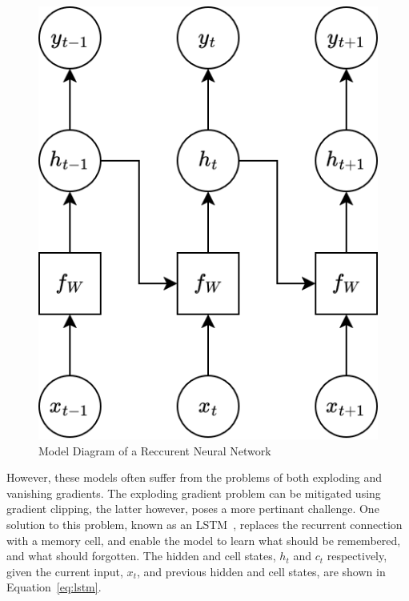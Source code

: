 \documentclass[twocolumn]{article}
\begin{document}
\begin{figure}[h]
    \centering
    \includegraphics[scale=0.25]{assets/rnn.png}
    \caption{Model Diagram of a Reccurent Neural Network}
    \label{fig:rnn}
\end{figure}

However, these models often suffer from the problems of both exploding and vanishing gradients. The exploding gradient problem can be mitigated using gradient clipping, the latter however, poses a more pertinant challenge. One solution to this problem, known as an LSTM~\cite{hochreiter1997long}, replaces the recurrent connection with a memory cell, and enable the model to learn what should be remembered, and what should forgotten. The hidden and cell states, $h_t$ and $c_t$ respectively, given the current input, $x_t$, and previous hidden and cell states, are shown in Equation~\ref{eq:lstm}. 
\end{document}

